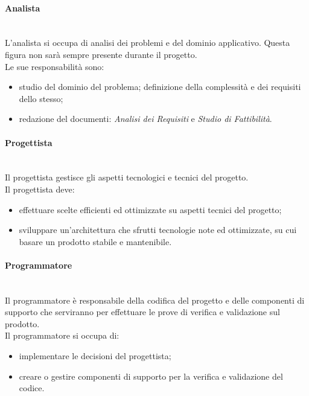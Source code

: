 			\paragraph{Analista} \mbox{}\\
			L'analista si occupa di analisi dei problemi e del dominio applicativo. Questa figura non sarà sempre presente durante il progetto. \\
			Le sue responsabilità sono:
			\begin{itemize}
				\item studio del dominio del problema; definizione della complessità  e dei requisiti dello stesso;
				\item redazione del documenti: \textit{Analisi dei Requisiti} e \textit{Studio di Fattibilità}.
			\end{itemize}
			\paragraph{Progettista} \mbox{}\\
			Il progettista gestisce gli aspetti tecnologici e tecnici del progetto.\\
			Il progettista deve:
			\begin{itemize}
				\item effettuare scelte efficienti ed ottimizzate su aspetti tecnici del progetto;
				\item sviluppare un'architettura che sfrutti tecnologie note ed ottimizzate, su cui basare un prodotto stabile e mantenibile.
			\end{itemize}
			\paragraph{Programmatore} \mbox{}\\
			Il programmatore è responsabile della codifica del progetto e delle componenti di supporto che serviranno per effettuare le prove di verifica e validazione sul prodotto.\\
			Il programmatore si occupa di:
			\begin{itemize}
				\item implementare le decisioni del progettista;
				\item creare o gestire componenti di supporto per la verifica e validazione del codice.
			\end{itemize}
